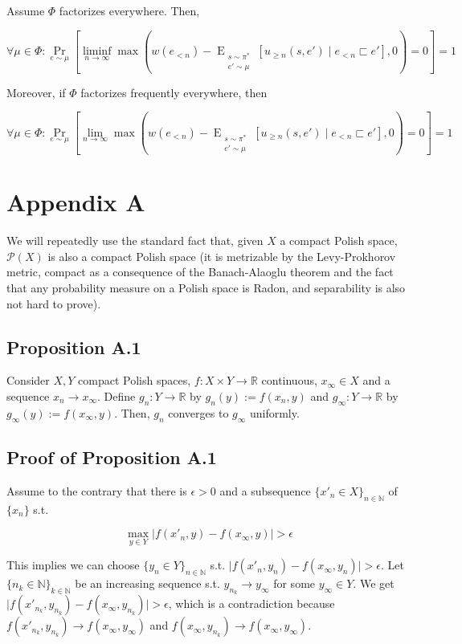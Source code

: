 \documentclass[a4paper]{article}
\DeclareMathOperator{\Prb}{Pr}
\newcommand{\EE}[2]{\operatorname{E}_{\substack{#1 \\ #2}}}
\newcommand{\Nats}{\mathbb{N}}
\newcommand{\Reals}{\mathbb{R}}
\newcommand{\Abs}[1]{\lvert #1 \rvert}
\newcommand{\Prob}{\mathcal{P}}
\begin{document}
Assume ${\Phi}$ factorizes everywhere. Then,

$$\forall \mu \in \Phi: \Prb_{e \sim \mu}[\liminf_{n \rightarrow \infty} \max(w(e_{<n})-\EE{s \sim \pi^*}{e' \sim \mu}[u_{\geq n}(s,e') \mid e_{<n} \sqsubset e'] ,0)=0] = 1$$

Moreover, if ${\Phi}$ factorizes frequently everywhere, then

$$\forall \mu \in \Phi: \Prb_{e \sim \mu}[\lim_{n \rightarrow \infty} \max(w(e_{<n})-\EE{s \sim \pi^*}{e' \sim \mu}[u_{\geq n}(s,e') \mid e_{<n} \sqsubset e'] ,0)=0] = 1$$

\section{Appendix A}

We will repeatedly use the standard fact that, given ${X}$ a compact Polish space, ${\Prob(X)}$ is also a compact Polish space (it is metrizable by the Levy-Prokhorov metric, compact as a consequence of the Banach-Alaoglu theorem and the fact that any probability measure on a Polish space is Radon, and separability is also not hard to prove).

\subsection{Proposition A.1}

Consider ${X, Y}$ compact Polish spaces, ${f: X \times Y \rightarrow \Reals}$ continuous, ${x_\infty \in X}$ and a sequence ${x_n \rightarrow x_\infty}$. Define ${g_n: Y \rightarrow \Reals}$ by ${g_n(y):=f(x_n,y)}$ and ${g_\infty: Y \rightarrow \Reals}$ by ${g_\infty(y):=f(x_\infty,y)}$. Then, ${g_n}$ converges to ${g_\infty}$ uniformly.

\subsection{Proof of Proposition A.1}

Assume to the contrary that there is ${\epsilon > 0}$ and a subsequence ${\{x'_n \in X\}_{n \in \Nats}}$ of ${\{x_n\}}$ s.t. 

$${\max_{y \in Y} \Abs{f(x'_n,y)-f(x_\infty,y)} > \epsilon}$$

This implies we can choose ${\{y_n \in Y\}_{n \in \Nats}}$ s.t. ${\Abs{f(x'_n,y_n)-f(x_\infty,y_n)} > \epsilon}$. Let ${\{n_k \in \Nats\}_{k \in \Nats}}$ be an increasing sequence s.t. ${y_{n_k} \rightarrow y_\infty}$ for some ${y_\infty \in Y}$. We get ${\Abs{f(x'_{n_k},y_{n_k})-f(x_\infty,y_{n_k})} > \epsilon}$, which is a contradiction because ${f(x'_{n_k},y_{n_k}) \rightarrow f(x_\infty,y_\infty)}$ and ${f(x_\infty,y_{n_k}) \rightarrow f(x_\infty,y_\infty)}$.
\end{document}
